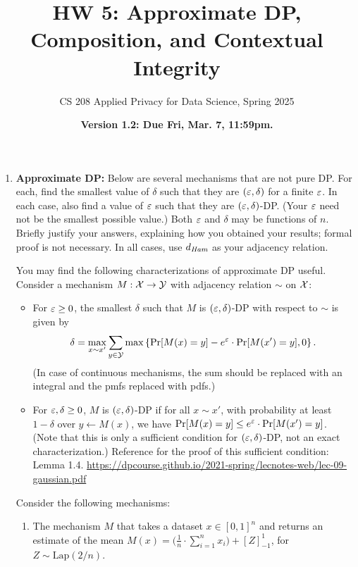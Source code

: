 \documentclass[11pt]{article}
\title{\vspace{-1.5cm} HW 5: Approximate DP, Composition, and Contextual Integrity}
\author{CS 208 Applied Privacy for Data Science, Spring 2025}
\date{\textbf{Version 1.2: Due Fri, Mar. 7, 11:59pm.}}
\begin{document}
\maketitle

\instructions

\begin{enumerate}[leftmargin=*]

\item \textbf{Approximate DP:}  
Below are several mechanisms that are not pure DP.  For each, find the smallest value of $\delta$ such that they are $(\varepsilon,\delta)$ for a finite $\varepsilon$.  In each case, also find a value of $\varepsilon$ such that they are $(\varepsilon,\delta)$-DP.  (Your $\varepsilon$ need not be the smallest possible value.)  Both $\varepsilon$ and $\delta$ may be functions of $n$.
Briefly justify your answers, explaining how you obtained your results; formal proof is not necessary.  In all cases, use $d_{\textit{Ham}}$ as your adjacency relation. 

You may find the following characterizations of approximate DP useful. Consider a mechanism $M : \mathcal{X}\rightarrow \mathcal{Y}$ with adjacency relation $\sim$ on $\mathcal{X}$:
\begin{itemize}
\item For $\varepsilon\geq 0$, the smallest $\delta$ such that $M$ is $(\varepsilon,\delta)$-DP with respect to $\sim$ is given by
$$\delta = \max_{x\sim x'} \sum_{y\in \mathcal{Y}} \max\left\{\Pr[M(x)=y]-e^\varepsilon\cdot \Pr[M(x')=y],0\right\}.$$
(In case of continuous mechanisms, the sum should be replaced with an integral and the pmfs replaced with pdfs.)

\item For $\varepsilon,\delta\geq 0$, $M$ is $(\varepsilon,\delta)$-DP if for all $x\sim x'$, with probability at least $1-\delta$ over $y\gets M(x)$, we have 
$\Pr[M(x)=y]\leq e^\varepsilon \cdot \Pr[M(x')=y]$.  (Note that this is only a sufficient condition for $(\varepsilon,\delta)$-DP, not an exact characterization.) Reference for the proof of this sufficient condition: Lemma 1.4. \url{https://dpcourse.github.io/2021-spring/lecnotes-web/lec-09-gaussian.pdf}
\end{itemize}


\enlargethispage{2\baselineskip}
Consider the following mechanisms:

\begin{enumerate} %
    \item  The mechanism $M$ that takes a dataset $x\in [0,1]^n$ and returns an estimate of the mean $M(x) = \Big(\frac{1}{n}\cdot \sum_{i=1}^n x_i\Big)+ [Z]^1_{-1}$, for $Z\sim \mathrm{Lap}(2/n)$.


\end{enumerate}
\end{enumerate}
\end{document}
